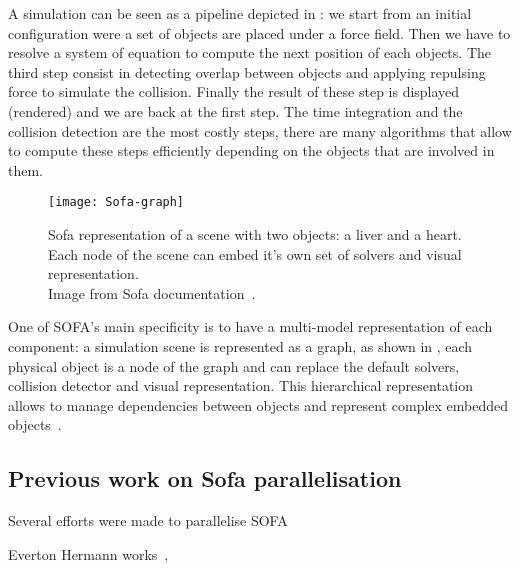 A simulation can be seen as a pipeline depicted in : we
start from an initial configuration were a set of objects are placed under a
force field. Then we have to resolve a system of equation to compute the next
position of each objects. The third step consist in detecting overlap between
objects and applying repulsing force to simulate the collision.  Finally the
result of these step is displayed (rendered) and we are back at the first
step. The time integration and the collision detection are the most costly
steps, there are many algorithms that allow to compute these steps efficiently
depending on the objects that are involved in them.

\begin{figure}[htb]
    \centering
    \texttt{[image: Sofa-graph]}
    \caption[Example of Sofa scene graph]{Sofa representation of a scene with two objects: a liver and a
        heart. Each node of the scene can embed it's own set of solvers and
        visual representation.\\
        Image from Sofa documentation~\cite{SOFA16Sofa}.}
    \label{fig:sofa-tree}
\end{figure}

One of \gls{SOFA}'s main specificity is to have a multi-model representation
of each component: a simulation scene is represented as a graph, as shown in
, each physical object is a node of the graph and can replace
the default solvers, collision detector and visual representation. This
hierarchical representation allows to manage dependencies between objects and
represent complex embedded objects~\cite{Nesme09Preserving,Faure11Sparse}.


\subsection{Previous work on Sofa parallelisation}

Several efforts were made to parallelise \gls{SOFA}

Everton Hermann works~\cite{Hermann10Simulations}, 

